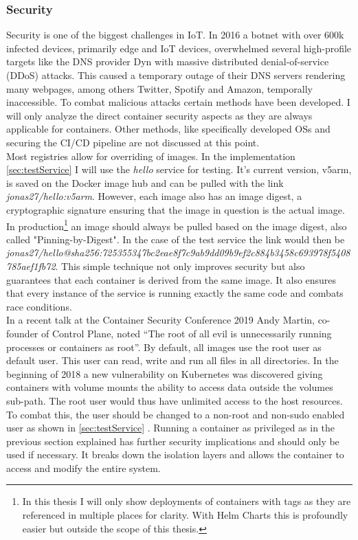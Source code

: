 \subsubsection{Security}
Security is one of the biggest challenges in IoT. In 2016 a botnet with over 600k infected devices, primarily edge and IoT devices, overwhelmed several high-profile targets like the DNS provider Dyn with massive distributed denial-of-service (DDoS) attacks. This caused a temporary outage of their DNS servers rendering many webpages, among others  Twitter, Spotify and Amazon, temporally inaccessible. To combat malicious attacks certain methods have been developed. I will only analyze the direct container security aspects as they are always applicable for containers. Other methods, like specifically developed OSs and securing the CI/CD pipeline are not discussed at this point.\\
Most registries allow for overriding of images. In the implementation \cref{sec:testService}  I will use the \textit{hello} service for testing. It's current version, v5arm, is saved on the Docker image hub and can be pulled with the link \textit{jonas27/hello:v5arm}. However, each image also has an image digest, a cryptographic signature ensuring that the image in question is the actual image. In production\footnote{In this thesis I will only show deployments of containers with tags as they are referenced in multiple places for clarity. With Helm Charts this is profoundly easier but outside the scope of this thesis.} an image should always be pulled based on the image digest, also called "Pinning-by-Digest". In the case of the test service the link would then be \textit{jonas27/hello@sha256:725355347bc2eae8f7c9ab9dd09b9ef2c884b3458c693978f5408785aef1fb72}. This simple technique not only improves security but also guarantees that each container is derived from the same image. It also ensures that every instance of the service is running exactly the same code and combats race conditions.\\
In a recent talk at the Container Security Conference 2019 Andy Martin, co-founder of Control Plane, noted ``The root of all evil is unnecessarily running processes or containers as root''\cite{RootlessContainerSecurityTalk0:online}. By default, all images use the root user as default user. This user can read, write and run all files in all directories. In the beginning of 2018 a new vulnerability on Kubernetes was discovered giving containers with volume mounts the ability to access data outside the volumes sub-path. The root user would thus have unlimited access to the host resources. To combat this, the user should be changed to a non-root and non-sudo enabled user as shown in \cref{sec:testService} . Running a container as privileged as in the previous section explained has further security implications and should only be used if necessary. It breaks down the isolation layers and allows the container to access and modify the entire system.\\

